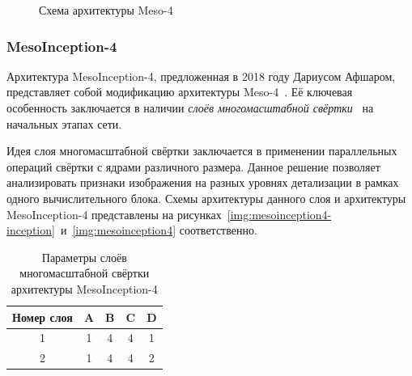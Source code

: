 \begin{figure}[H]
	\caption{Схема архитектуры Meso-4}
	\label{img:meso4}
\end{figure}


\subsubsection{MesoInception-4}

Архитектура MesoInception-4, предложенная в 2018 году Дариусом Афшаром, представляет собой модификацию архитектуры Meso-4~\cite{meso4}. Её ключевая особенность заключается в наличии \textit{слоёв многомасштабной свёртки}~\cite{inception} на начальных этапах сети.

Идея слоя многомасштабной свёртки заключается в применении параллельных операций свёртки с ядрами различного размера. Данное решение позволяет анализировать признаки изображения на разных уровнях детализации в рамках одного вычислительного блока. Схемы архитектуры данного слоя и архитектуры MesoInception-4 представлены на рисунках~\ref{img:mesoinception4-inception}~и~\ref{img:mesoinception4} соответственно.

\begin{table}[h]
	\centering
	\caption{Параметры слоёв многомасштабной свёртки архитектуры MesoInception-4}
	\label{tbl:mesoinception4-inception-params}
	\begin{tabular}{|c|c|c|c|c|}
		\hline
		\textbf{Номер слоя} & \textbf{A} & \textbf{B} & \textbf{C} & \textbf{D} \\
		\hline
		1 & 1 & 4 & 4 & 1 \\
		\hline
		2 & 1 & 4 & 4 & 2 \\
		\hline
	\end{tabular}
\end{table}

